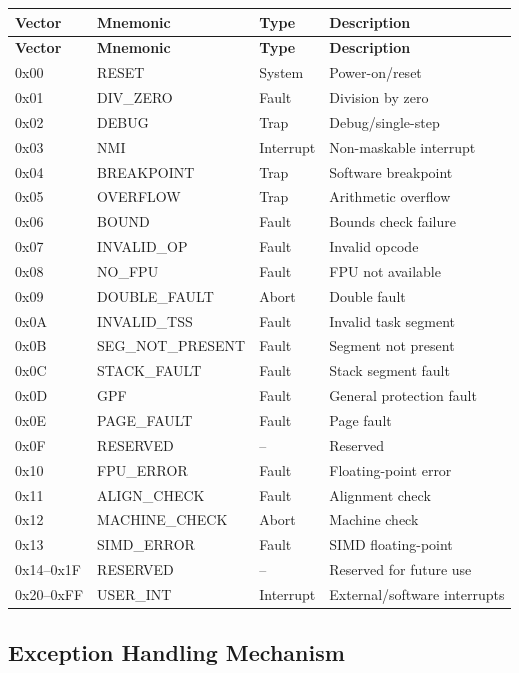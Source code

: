 \documentclass[12pt]{article}
\begin{document}
\begin{longtable}{@{}llll@{}}
\toprule
\textbf{Vector} & \textbf{Mnemonic} & \textbf{Type} & \textbf{Description} \\ \midrule
\endfirsthead
\toprule
\textbf{Vector} & \textbf{Mnemonic} & \textbf{Type} & \textbf{Description} \\ \midrule
\endhead
0x00 & RESET & System & Power-on/reset \\
0x01 & DIV\_ZERO & Fault & Division by zero \\
0x02 & DEBUG & Trap & Debug/single-step \\
0x03 & NMI & Interrupt & Non-maskable interrupt \\
0x04 & BREAKPOINT & Trap & Software breakpoint \\
0x05 & OVERFLOW & Trap & Arithmetic overflow \\
0x06 & BOUND & Fault & Bounds check failure \\
0x07 & INVALID\_OP & Fault & Invalid opcode \\
0x08 & NO\_FPU & Fault & FPU not available \\
0x09 & DOUBLE\_FAULT & Abort & Double fault \\
0x0A & INVALID\_TSS & Fault & Invalid task segment \\
0x0B & SEG\_NOT\_PRESENT & Fault & Segment not present \\
0x0C & STACK\_FAULT & Fault & Stack segment fault \\
0x0D & GPF & Fault & General protection fault \\
0x0E & PAGE\_FAULT & Fault & Page fault \\
0x0F & RESERVED & -- & Reserved \\
0x10 & FPU\_ERROR & Fault & Floating-point error \\
0x11 & ALIGN\_CHECK & Fault & Alignment check \\
0x12 & MACHINE\_CHECK & Abort & Machine check \\
0x13 & SIMD\_ERROR & Fault & SIMD floating-point \\
0x14--0x1F & RESERVED & -- & Reserved for future use \\
0x20--0xFF & USER\_INT & Interrupt & External/software interrupts \\ \bottomrule
\end{longtable}

\subsection{Exception Handling Mechanism}
\end{document}
